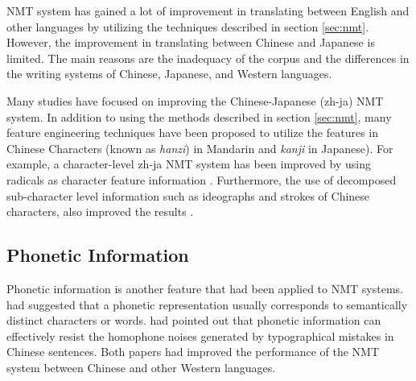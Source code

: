 NMT system has gained a lot of improvement in translating between English and other languages by utilizing the techniques described in section \ref{sec:nmt}. However, the improvement in translating between Chinese and Japanese is limited. The main reasons are the inadequacy of the corpus and the differences in the writing systems of Chinese, Japanese, and Western languages.

Many studies have focused on improving the Chinese-Japanese (zh-ja) NMT system. In addition to using the methods \cite{imamura2018enhancement, chu2017empirical, zhang2020parallel} described in section \ref{sec:nmt}, many feature engineering techniques have been proposed to utilize the features in Chinese Characters (known as \textit{hanzi}) in Mandarin and \textit{kanji} in Japanese).  For example, a character-level zh-ja NMT system has been improved by using radicals as character feature information \cite{8300572}. Furthermore, the use of decomposed sub-character level information such as ideographs and strokes of Chinese characters, also improved the results \cite{zhang-komachi-2018-neural}.

\subsection{Phonetic Information} \label{sec:phonetic}

Phonetic information is another feature that had been applied to NMT systems. \cite{khan2019diversity} had suggested that a phonetic representation usually corresponds to semantically distinct characters or words. \cite{liu-etal-2019-robust} had pointed out that phonetic information can effectively resist the homophone noises generated by typographical mistakes in Chinese sentences. Both papers had improved the performance of the NMT system between Chinese and other Western languages.

